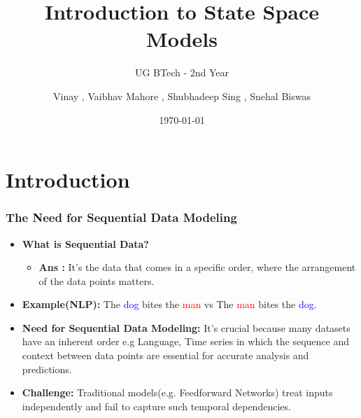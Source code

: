 \documentclass{beamer}
\title{Introduction to State Space Models}
\subtitle{UG BTech - 2nd Year}
\author{Vinay , Vaibhav Mahore , Shubhadeep Sing , Snehal Biswas}
\institute{Indian Institute of Science, Bangalore}
\date{\today}
\begin{document}
\frame{\titlepage}



\section{Introduction}

\begin{frame}
\frametitle{The Need for Sequential Data Modeling}
\begin{itemize}
    \item \textbf{What is Sequential Data?}   \\
    \begin{itemize}
        \item \textbf{Ans :} It's the  data that comes in a specific order, where the arrangement of the data points matters.
    \end{itemize}
    \item \textbf{Example(NLP):}  
    The \textcolor{blue}{dog} bites the \textcolor{red}{man} vs The \textcolor{red}{man} bites the \textcolor{blue}{dog}.
    \item \textbf{Need for Sequential Data Modeling:}
    It's crucial because many datasets have an inherent order e.g Language, Time series in which the sequence and context between data points are essential for accurate analysis and predictions.
    \item \textbf{Challenge:}  
    Traditional models(e.g. Feedforward Networks) treat inputs independently and fail to capture such temporal dependencies.
\end{itemize}
\end{frame}
\end{document}
